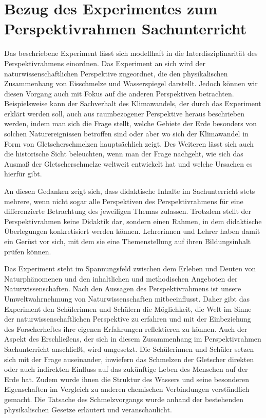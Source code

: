 \section{Bezug des Experimentes zum Perspektivrahmen Sachunterricht}
Das beschriebene Experiment lässt sich modellhaft in die Interdisziplinarität des Perspektivrahmens einordnen.
Das Experiment an sich wird der naturwissenschaftlichen Perspektive zugeordnet, die den physikalischen Zusammenhang von Eisschmelze und Wasserspiegel darstellt.
Jedoch können wir diesen Vorgang auch mit Fokus auf die anderen Perspektiven betrachten.
Beispielsweise kann der Sachverhalt des Klimawandels, der durch das Experiment erklärt werden soll, auch aus raumbezogener Perspektive heraus beschrieben werden, indem man sich die Frage stellt, welche Gebiete der Erde besonders von solchen Naturereignissen betroffen sind oder aber wo sich der Klimawandel in Form von Gletscherschmelzen hauptsächlich zeigt.
Des Weiteren lässt sich auch die historische Sicht beleuchten, wenn man der Frage nachgeht, wie sich das Ausmaß der Gletscherschmelze weltweit entwickelt hat und welche Ursachen es hierfür gibt.

An diesen Gedanken zeigt sich, dass didaktische Inhalte im Sachunterricht stets mehrere, wenn nicht sogar alle Perspektiven des Perspektivrahmens für eine differenzierte Betrachtung des jeweiligen Themas zulassen.
Trotzdem stellt der Perspektivrahmen keine Didaktik dar, sondern einen \glqq Rahmen, in dem didaktische Überlegungen konkretisiert werden können. Lehrerinnen und Lehrer haben damit ein Gerüst vor sich, mit dem sie eine Themenstellung auf ihren Bildungsinhalt prüfen können.
 
Das Experiment steht im Spannungsfeld zwischen \glqq dem Erleben und Deuten von Naturphänomenen und den inhaltlichen und methodischen Angeboten der Naturwissenschaften.
Nach den Aussagen des Perspektivrahmens ist unsere Umweltwahrnehmung von Naturwissenschaften mitbeeinflusst.
Daher gibt das Experiment den Schülerinnen und Schülern die Möglichkeit, die Welt im Sinne der naturwissenschaftlichen Perspektive zu erfahren und mit der Einbeziehung des Forscherheftes ihre eigenen Erfahrungen reflektieren zu können.
Auch der Aspekt des \glqq Erschließens\grqq{}, der sich in diesem Zusammenhang im Perspektivrahmen Sachunterricht anschließt, wird umgesetzt.
Die Schülerinnen und Schüler setzen sich mit der Frage auseinander, inwiefern das Schmelzen der Gletscher direkten oder auch indirekten Einfluss auf das zukünftige Leben des Menschen auf der Erde hat.
Zudem wurde ihnen die Struktur des Wassers und seine besonderen Eigenschaften im Vergleich zu anderen chemischen Verbindungen verständlich gemacht.
Die Tatsache des Schmelzvorgangs wurde anhand der bestehenden physikalischen Gesetze erläutert und veranschaulicht.

